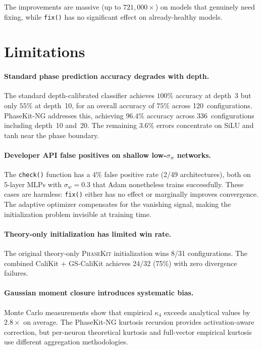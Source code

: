 \documentclass[10pt]{article}
\newcommand{\ToolName}{\textsc{PhaseKit}}
\begin{document}
The improvements are massive (up to $721{,}000\times$) on models that genuinely need fixing, while \texttt{fix()} has no significant effect on already-healthy models.

\section{Limitations}
\label{sec:limitations}

\paragraph{Standard phase prediction accuracy degrades with depth.}
The standard depth-calibrated classifier achieves $100\%$ accuracy at depth~3 but only $55\%$ at depth~10, for an overall accuracy of $75\%$ across 120~configurations.
PhaseKit-NG addresses this, achieving $96.4\%$ accuracy across 336~configurations including depth~10 and~20.
The remaining $3.6\%$ errors concentrate on SiLU and tanh near the phase boundary.

\paragraph{Developer API false positives on shallow low-$\sigma_w$ networks.}
The \texttt{check()} function has a $4\%$ false positive rate (2/49 architectures), both on 5-layer MLPs with $\sigma_w = 0.3$ that Adam nonetheless trains successfully.
These cases are harmless: \texttt{fix()} either has no effect or marginally improves convergence.
The adaptive optimizer compensates for the vanishing signal, making the initialization problem invisible at training time.

\paragraph{Theory-only initialization has limited win rate.}
The original theory-only \ToolName{} initialization wins 8/31 configurations.
The combined CaliKit + GS-CaliKit achieves 24/32 (75\%) with zero divergence failures.

\paragraph{Gaussian moment closure introduces systematic bias.}
Monte Carlo measurements show that empirical $\kappa_4$ exceeds analytical values by $2.8\times$ on average.
The PhaseKit-NG kurtosis recursion provides activation-aware correction, but per-neuron theoretical kurtosis and full-vector empirical kurtosis use different aggregation methodologies.
\end{document}
